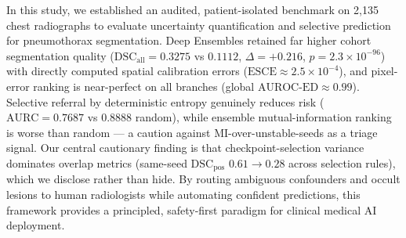 \documentclass[11pt,a4paper]{article}
\begin{document}
In this study, we established an audited, patient-isolated benchmark on 2,135 chest radiographs to evaluate uncertainty quantification and selective prediction for pneumothorax segmentation. Deep Ensembles retained far higher cohort segmentation quality ($\text{DSC}_{\text{all}} = 0.3275$ vs $0.1112$, $\Delta = +0.216$, $p = 2.3 \times 10^{-96}$) with directly computed spatial calibration errors ($\text{ESCE} \approx 2.5 \times 10^{-4}$), and pixel-error ranking is near-perfect on all branches (global $\text{AUROC-ED} \approx 0.99$). Selective referral by deterministic entropy genuinely reduces risk ($\text{AURC} = 0.7687$ vs $0.8888$ random), while ensemble mutual-information ranking is worse than random — a caution against MI-over-unstable-seeds as a triage signal. Our central cautionary finding is that checkpoint-selection variance dominates overlap metrics (same-seed $\text{DSC}_{\text{pos}}$ $0.61 \to 0.28$ across selection rules), which we disclose rather than hide. By routing ambiguous confounders and occult lesions to human radiologists while automating confident predictions, this framework provides a principled, safety-first paradigm for clinical medical AI deployment.



\end{document}
